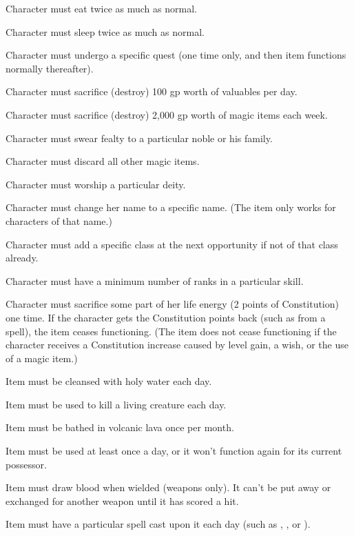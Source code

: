 \begin{itemize*}
\item Character must eat twice as much as normal.
\item Character must sleep twice as much as normal.
\item Character must undergo a specific quest (one time only, and then item functions normally thereafter).
\item Character must sacrifice (destroy) 100 gp worth of valuables per day.
\item Character must sacrifice (destroy) 2,000 gp worth of magic items each week.
\item Character must swear fealty to a particular noble or his family.
\item Character must discard all other magic items.
\item Character must worship a particular deity.
\item Character must change her name to a specific name. (The item only works for characters of that name.)
\item Character must add a specific class at the next opportunity if not of that class already.
\item Character must have a minimum number of ranks in a particular skill.
\item Character must sacrifice some part of her life energy (2 points of Constitution) one time. If the character gets the Constitution points back (such as from a  spell), the item ceases functioning. (The item does not cease functioning if the character receives a Constitution increase caused by level gain, a wish, or the use of a magic item.)
\item Item must be cleansed with holy water each day.
\item Item must be used to kill a living creature each day.
\item Item must be bathed in volcanic lava once per month.
\item Item must be used at least once a day, or it won't function again for its current possessor.
\item Item must draw blood when wielded (weapons only). It can't be put away or exchanged for another weapon until it has scored a hit.
\item Item must have a particular spell cast upon it each day (such as , , or ).
\end{itemize*}

